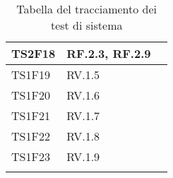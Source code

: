 \begin{center}
\begin{longtable}{|p{1.5cm}|p{11cm}|p{1cm}|}
            \rowcolor[HTML]{C0C0C0}
            TS2F18 & RF.2.3, RF.2.9\\ \hline
            \rowcolor[HTML]{EFEFEF}
            TS1F19 & RV.1.5\\ \hline
            \rowcolor[HTML]{C0C0C0}
            TS1F20 & RV.1.6\\ \hline
            \rowcolor[HTML]{EFEFEF}
            TS1F21 & RV.1.7\\ \hline
            \rowcolor[HTML]{C0C0C0}
            TS1F22 & RV.1.8\\ \hline
            \rowcolor[HTML]{EFEFEF}
            TS1F23 & RV.1.9\\ \hline
            \caption{Tabella del tracciamento dei test di sistema }
        \end{longtable}
    \end{center}


